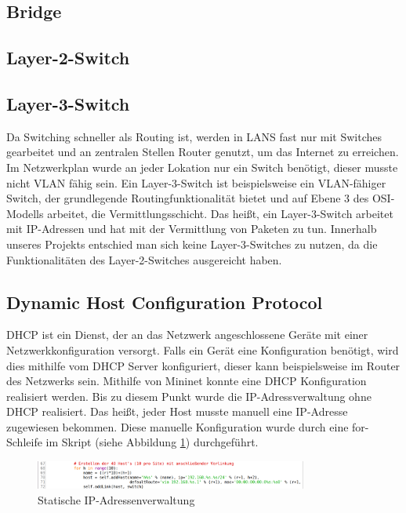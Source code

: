 \documentclass[fontsize=12pt,paper=a4,open=any,parskip=half,
  twoside=false,toc=listof,toc=bibliography,fleqn,leqno,
  captions=nooneline,captions=tableabove,british]{scrbook}
\begin{document}
\subsection{Bridge}

\subsection{Layer-2-Switch}

\subsection{Layer-3-Switch}
Da Switching schneller als Routing ist, werden in LANS fast nur mit Switches gearbeitet und an zentralen Stellen Router genutzt, um das Internet zu erreichen. Im Netzwerkplan wurde an jeder Lokation nur ein Switch benötigt, dieser musste nicht VLAN fähig sein. Ein Layer-3-Switch ist beispielsweise ein VLAN-fähiger Switch, der grundlegende Routingfunktionalität bietet und auf Ebene 3 des OSI-Modells arbeitet, die Vermittlungsschicht. Das heißt, ein Layer-3-Switch arbeitet mit IP-Adressen und hat mit der Vermittlung von Paketen zu tun. Innerhalb unseres Projekts entschied man sich keine Layer-3-Switches zu nutzen, da die Funktionalitäten des Layer-2-Switches ausgereicht haben. 
\subsection{Dynamic Host Configuration Protocol}
DHCP ist ein Dienst, der an das Netzwerk angeschlossene Geräte mit einer Netzwerkkonfiguration versorgt. Falls ein Gerät eine Konfiguration benötigt, wird dies mithilfe vom DHCP Server konfiguriert, dieser kann beispielsweise im Router des Netzwerks sein. Mithilfe von Mininet konnte eine DHCP Konfiguration realisiert werden. Bis zu diesem Punkt wurde die IP-Adressverwaltung ohne DHCP realisiert. Das heißt, jeder Host musste manuell eine IP-Adresse zugewiesen bekommen. Diese manuelle Konfiguration wurde durch eine for-Schleife im Skript (siehe Abbildung \ref{fororig}) durchgeführt.

\begin{figure}[H]
 \centering
 \includegraphics[width=0.8\textwidth]{Bilder/fororig}
 \captionsetup{justification=centering}
 \caption{Statische IP-Adressenverwaltung}
 \label{fororig}
\end{figure}
\end{document}
